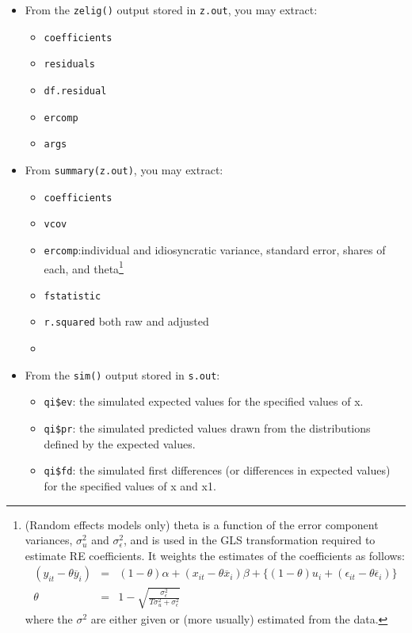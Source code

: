 \begin{itemize}
\item From the {\tt zelig()} output stored in {\tt z.out}, you may
extract:
\begin{itemize}
\item	\texttt{coefficients}
\item	\texttt{residuals}
\item	\texttt{df.residual}
\item	\texttt{ercomp}
\item	\texttt{args}
\end{itemize}
\item From {\tt summary(z.out)}, you may extract:
\begin{itemize}
\item	\texttt{coefficients}
\item	\texttt{vcov}
\item	\texttt{ercomp}:individual and idiosyncratic variance, standard error, shares of each, and theta\footnote{(Random effects models only) theta is a function of the error component variances, \(\sigma^2_u\) and \(\sigma^2_\epsilon\), and is used in the GLS transformation required to estimate RE coefficients. It weights the estimates of the coefficients as follows:
\begin{eqnarray*}(y_{it}-\theta\overline{y}_i)	&	=	& (1-\theta)\alpha + (x_{it}-\theta\overline{x}_i)\beta + \{(1-\theta)u_i + (\epsilon_{it}-\theta\overline{\epsilon}_i)\} \\
\theta	&	=	&	1- \sqrt{\frac{\sigma^2_\epsilon}{T\sigma^2_u+\sigma^2_\epsilon}}
\end{eqnarray*}
where the \(\sigma^2\) are either given or (more usually) estimated from the data.
}
\item	\texttt{fstatistic}
\item	\texttt{r.squared} both raw and adjusted
\item	\texttt{} 
\end{itemize}
\item From the {\tt sim()} output stored in {\tt s.out}:
\begin{itemize}
\item	\texttt{qi\$ev}: the simulated expected values for the specified values of x.
\item	\texttt{qi\$pr}: the simulated predicted values drawn from the distributions defined by the expected values.
\item	\texttt{qi\$fd}: the simulated first differences (or differences in expected values) for the specified values of x and x1.
\end{itemize}
\end{itemize}


